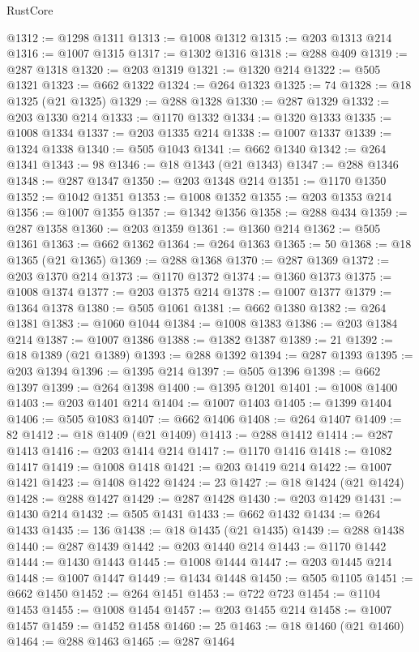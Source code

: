 \begin{lexlean}{RustCore}
\begin{coremodule}
@1312 := @1298 @1311
@1313 := @1008 @1312
@1315 := @203 @1313 @214
@1316 := @1007 @1315
@1317 := @1302 @1316
@1318 := @288 @409
@1319 := @287 @1318
@1320 := @203 @1319
@1321 := @1320 @214
@1322 := @505 @1321
@1323 := @662 @1322
@1324 := @264 @1323
@1325 := 74
@1328 := @18 @1325 (@21 @1325)
@1329 := @288 @1328
@1330 := @287 @1329
@1332 := @203 @1330 @214
@1333 := @1170 @1332
@1334 := @1320 @1333
@1335 := @1008 @1334
@1337 := @203 @1335 @214
@1338 := @1007 @1337
@1339 := @1324 @1338
@1340 := @505 @1043
@1341 := @662 @1340
@1342 := @264 @1341
@1343 := 98
@1346 := @18 @1343 (@21 @1343)
@1347 := @288 @1346
@1348 := @287 @1347
@1350 := @203 @1348 @214
@1351 := @1170 @1350
@1352 := @1042 @1351
@1353 := @1008 @1352
@1355 := @203 @1353 @214
@1356 := @1007 @1355
@1357 := @1342 @1356
@1358 := @288 @434
@1359 := @287 @1358
@1360 := @203 @1359
@1361 := @1360 @214
@1362 := @505 @1361
@1363 := @662 @1362
@1364 := @264 @1363
@1365 := 50
@1368 := @18 @1365 (@21 @1365)
@1369 := @288 @1368
@1370 := @287 @1369
@1372 := @203 @1370 @214
@1373 := @1170 @1372
@1374 := @1360 @1373
@1375 := @1008 @1374
@1377 := @203 @1375 @214
@1378 := @1007 @1377
@1379 := @1364 @1378
@1380 := @505 @1061
@1381 := @662 @1380
@1382 := @264 @1381
@1383 := @1060 @1044
@1384 := @1008 @1383
@1386 := @203 @1384 @214
@1387 := @1007 @1386
@1388 := @1382 @1387
@1389 := 21
@1392 := @18 @1389 (@21 @1389)
@1393 := @288 @1392
@1394 := @287 @1393
@1395 := @203 @1394
@1396 := @1395 @214
@1397 := @505 @1396
@1398 := @662 @1397
@1399 := @264 @1398
@1400 := @1395 @1201
@1401 := @1008 @1400
@1403 := @203 @1401 @214
@1404 := @1007 @1403
@1405 := @1399 @1404
@1406 := @505 @1083
@1407 := @662 @1406
@1408 := @264 @1407
@1409 := 82
@1412 := @18 @1409 (@21 @1409)
@1413 := @288 @1412
@1414 := @287 @1413
@1416 := @203 @1414 @214
@1417 := @1170 @1416
@1418 := @1082 @1417
@1419 := @1008 @1418
@1421 := @203 @1419 @214
@1422 := @1007 @1421
@1423 := @1408 @1422
@1424 := 23
@1427 := @18 @1424 (@21 @1424)
@1428 := @288 @1427
@1429 := @287 @1428
@1430 := @203 @1429
@1431 := @1430 @214
@1432 := @505 @1431
@1433 := @662 @1432
@1434 := @264 @1433
@1435 := 136
@1438 := @18 @1435 (@21 @1435)
@1439 := @288 @1438
@1440 := @287 @1439
@1442 := @203 @1440 @214
@1443 := @1170 @1442
@1444 := @1430 @1443
@1445 := @1008 @1444
@1447 := @203 @1445 @214
@1448 := @1007 @1447
@1449 := @1434 @1448
@1450 := @505 @1105
@1451 := @662 @1450
@1452 := @264 @1451
@1453 := @722 @723
@1454 := @1104 @1453
@1455 := @1008 @1454
@1457 := @203 @1455 @214
@1458 := @1007 @1457
@1459 := @1452 @1458
@1460 := 25
@1463 := @18 @1460 (@21 @1460)
@1464 := @288 @1463
@1465 := @287 @1464

\end{coremodule}
\end{lexlean}

